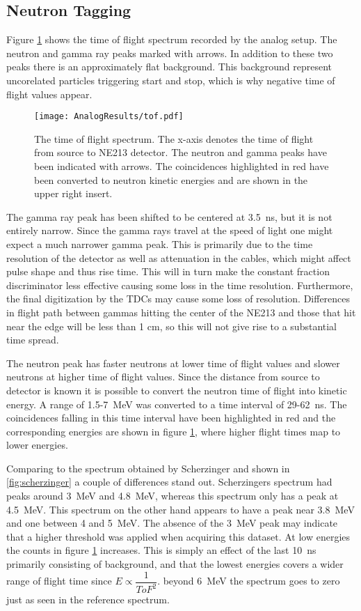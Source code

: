 \documentclass[main.tex]{subfiles}
\begin{document}
\subsection{Neutron Tagging}
Figure \ref{fig:tof_a} shows the time of flight spectrum recorded by the analog setup. The neutron and gamma ray peaks marked with arrows. In addition to these two peaks there is an approximately flat background. This background represent uncorelated particles triggering start and stop, which is why negative time of flight values appear.
\begin{figure}[ht]
    \centering
        \texttt{[image: AnalogResults/tof.pdf]}
        \caption{The time of flight spectrum. The x-axis denotes the time of flight from source to NE213 detector. The neutron and gamma peaks have been indicated with arrows. The coincidences highlighted in red have been converted to neutron kinetic energies and are shown in the upper right insert.}
    \label{fig:tof_a}
\end{figure}

The gamma ray peak has been shifted to be centered at \SI{3.5}{ns}, but it is not entirely narrow. Since the gamma rays travel at the speed of light one might expect a much narrower gamma peak. This is primarily due to the time resolution of the detector as well as attenuation in the cables, which might affect pulse shape and thus rise time. This will in turn make the constant fraction discriminator less effective causing some loss in the time resolution. Furthermore, the final  digitization by the TDCs may cause some loss of resolution. Differences in flight path between gammas hitting the center of the NE213 and those that hit near the edge will be less than 1 cm, so this will not give rise to a substantial time spread. 

The neutron peak has faster neutrons at lower time of flight values and slower neutrons at higher time of flight values. Since the distance from source to detector is known it is possible to convert the neutron time of flight into kinetic energy. A range of 1.5-\SI{7}{\MeV} was converted to a time interval of 29-\SI{62}{\ns}. The coincidences falling in this time interval have been highlighted in red and the corresponding energies are shown in figure \ref{fig:tof_a}, where higher flight times map to lower energies.

Comparing to the spectrum obtained by Scherzinger\cite{ScherzingerPhd} and shown in \ref{fig:scherzinger} a couple of differences stand out. Scherzingers spectrum had peaks around \SI{3}{\MeV} and \SI{4.8}{\MeV}, whereas this spectrum only has a peak at \SI{4.5}{\MeV}. This spectrum on the other hand appears to have a peak near \SI{3.8}{\MeV} and one between 4 and \SI{5}{\MeV}. The absence of the \SI{3}{\MeV} peak may indicate that a higher threshold was applied when acquiring this dataset. At low energies the counts in figure \ref{fig:tof_a} increases. This is simply an effect of the last \SI{10}{\ns} primarily consisting of background, and that the lowest energies covers a wider range of flight time since $E\propto \dfrac{1}{ToF^2}$. beyond \SI{6}{\MeV} the spectrum goes to zero just as seen in the reference spectrum.
\end{document}
